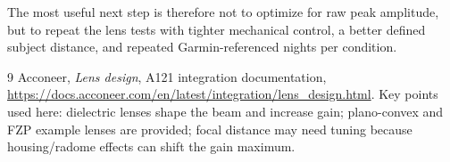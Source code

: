 \documentclass[11pt,a4paper]{article}
\begin{document}
The most useful next step is therefore not to optimize for raw peak amplitude, but to repeat the lens tests with tighter mechanical control, a better defined subject distance, and repeated Garmin-referenced nights per condition.

\begin{thebibliography}{9}
Acconeer,
\emph{Lens design}, A121 integration documentation,
\url{https://docs.acconeer.com/en/latest/integration/lens_design.html}.
Key points used here: dielectric lenses shape the beam and increase gain;
plano-convex and FZP example lenses are provided; focal distance may need
tuning because housing/radome effects can shift the gain maximum.
\end{thebibliography}
\end{document}
